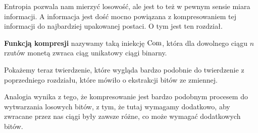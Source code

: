 Entropia pozwala nam mierzyć losowość, ale jest to też w pewnym sensie miara informacji.
A informacja jest dość mocno powiązana z kompresowaniem tej informacji do najbardziej upakowanej postaci.
O tym jest ten rozdział.

\begin{definition}
	\textbf{Funkcją kompresji} nazywamy taką iniekcję \( \operatorname{Com} \), która dla dowolnego ciągu \( n \) rzutów monetą zwraca ciąg unikatowy ciągi binarny.
\end{definition}

Pokażemy teraz twierdzenie, które wygląda bardzo podobnie do twierdzenie z poprzedniego rozdziału, które mówiło o ekstrakcji bitów ze zmiennej.

Analogia wynika z tego, że kompresowanie jest bardzo podobnym procesem do wytwarzania losowych bitów,
z tym, że tutaj wymagamy dodatkowo, aby zwracane przez nas ciągi były zawsze różne, co może wymagać dodatkowych bitów.

